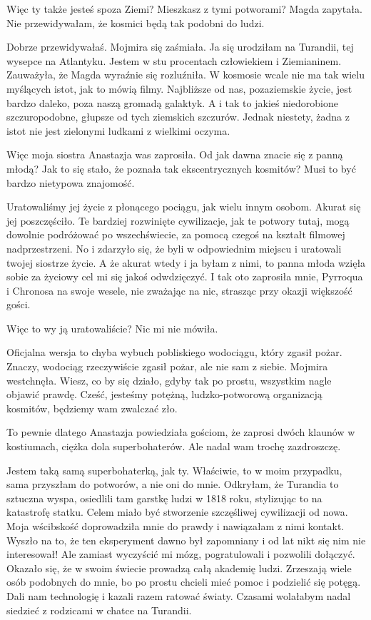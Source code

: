 \ds{} Więc ty także jesteś spoza Ziemi? Mieszkasz z tymi potworami? \dm{} Magda zapytała. \dm{} Nie przewidywałam, że kosmici będą tak podobni do ludzi. \de{}

\ds{} Dobrze przewidywałaś. \dm{} Mojmira się zaśmiała. \dm{} Ja się urodziłam na Turandii, tej wysepce na Atlantyku. Jestem w stu procentach człowiekiem i Ziemianinem.
\dm{} Zauważyła, że Magda wyraźnie się rozluźniła. \dm{} W kosmosie wcale nie ma tak wielu myślących istot, jak to mówią filmy. 
Najbliższe od nas, pozaziemskie życie, jest bardzo daleko, poza naszą gromadą galaktyk. A i tak to jakieś niedorobione szczuropodobne, głupsze od tych ziemskich szczurów.
Jednak niestety, żadna z istot nie jest zielonymi ludkami z wielkimi oczyma.\de{}

\ds{} Więc moja siostra Anastazja was zaprosiła. Od jak dawna znacie się z panną młodą? Jak to się stało, że poznała tak ekscentrycznych kosmitów? Musi to być bardzo nietypowa znajomość. \de{} 

\ds{} Uratowaliśmy jej życie z płonącego pociągu, jak wielu innym osobom. 
Akurat się jej poszczęściło.
Te bardziej rozwinięte cywilizacje, jak te potwory tutaj, mogą dowolnie podróżować po wszechświecie, za pomocą czegoś na kształt filmowej nadprzestrzeni.
No i zdarzyło się, że byli w odpowiednim miejscu i uratowali twojej siostrze życie.
A że akurat wtedy i ja byłam z nimi, to panna młoda wzięła sobie za życiowy cel mi się jakoś odwdzięczyć. 
I tak oto zaprosiła mnie, Pyrroqua i Chronosa na swoje wesele, nie zważając na nic, strasząc przy okazji większość gości.\de{}

\ds{} Więc to wy ją uratowaliście? Nic mi nie mówiła. \de{}

\ds{} Oficjalna wersja to chyba wybuch pobliskiego wodociągu, który zgasił pożar. 
Znaczy, wodociąg rzeczywiście zgasił pożar, ale nie sam z siebie.
\dm{} Mojmira westchnęła. \dm{}
Wiesz, co by się działo, gdyby tak po prostu, wszystkim nagle objawić prawdę.
Cześć, jesteśmy potężną, ludzko-potworową organizacją kosmitów, będziemy wam zwalczać zło.

\ds{} To pewnie dlatego Anastazja powiedziała gościom, że zaprosi dwóch klaunów w kostiumach, ciężka dola superbohaterów. Ale nadal wam trochę zazdroszczę.\de{}

\ds{} Jestem taką samą superbohaterką, jak ty. Właściwie, to w moim przypadku, sama przyszłam do potworów, a nie oni do mnie.
Odkryłam, że Turandia to sztuczna wyspa, osiedlili tam garstkę ludzi w 1818 roku, stylizując to na katastrofę statku.
Celem miało być stworzenie szczęśliwej cywilizacji od nowa. Moja wścibskość doprowadziła mnie do prawdy i nawiązałam z nimi kontakt.
Wyszło na to, że ten eksperyment dawno był zapomniany i od lat nikt się nim nie interesował!
Ale zamiast wyczyścić mi mózg, pogratulowali i pozwolili dołączyć. 
Okazało się, że w swoim świecie prowadzą całą akademię ludzi. Zrzeszają wiele osób podobnych do mnie, bo po prostu chcieli mieć pomoc i podzielić się potęgą.
Dali nam technologię i kazali razem ratować światy. Czasami wolałabym nadal siedzieć z rodzicami w chatce na Turandii.

